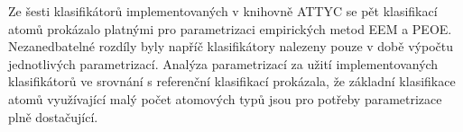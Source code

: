 \noindent Ze šesti klasifikátorů implementovaných v knihovně ATTYC se pět klasifikací atomů prokázalo platnými pro parametrizaci empirických metod EEM a PEOE. Nezanedbatelné rozdíly byly napříč klasifikátory nalezeny pouze v době výpočtu jednotlivých parametrizací. Analýza parametrizací za užití implementovaných klasifikátorů ve srovnání s referenční klasifikací prokázala, že základní klasifikace atomů využívající malý počet atomových typů jsou pro potřeby parametrizace plně dostačující.

